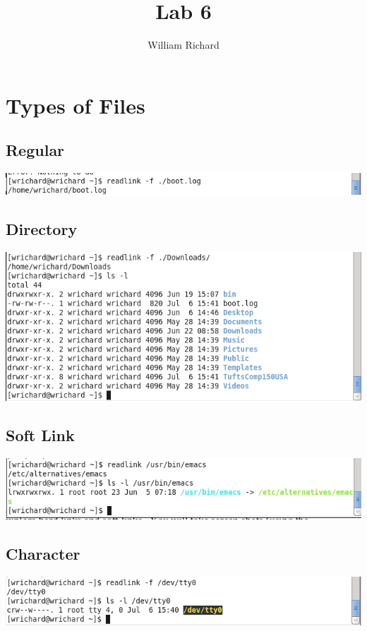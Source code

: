 \documentclass[a4paper,10pt]{article}
\title{Lab 6}
\author{William Richard}
\begin{document}
\maketitle

\section{Types of Files}
\subsection{Regular}
  \begin{center}
  \includegraphics[width=\linewidth]{./regular.png}
  \end{center}

\subsection{Directory}
  \begin{center}
  \includegraphics[width=\linewidth]{./directory.png}
  \end{center}

\subsection{Soft Link}
  \begin{center}
  \includegraphics[width=\linewidth]{./link.png}
  \end{center}

\subsection{Character}
  \begin{center}
  \includegraphics[width=\linewidth]{./character.png}
  \end{center}
\end{document}
